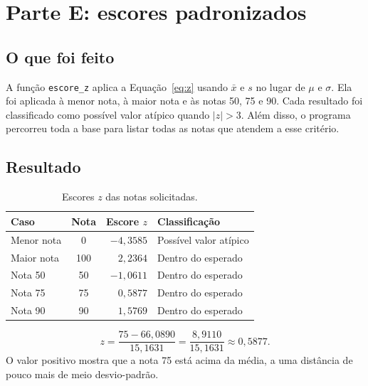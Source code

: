 \documentclass[12pt,a4paper]{article}
\begin{document}
\section{Parte E: escores padronizados}\label{sec:e}

\subsection{O que foi feito}

A função \texttt{escore\_z} aplica a Equação~\eqref{eq:z} usando $\bar{x}$ e $s$ no lugar de $\mu$ e $\sigma$. Ela foi aplicada à menor nota, à maior nota e às notas 50, 75 e 90. Cada resultado foi classificado como possível valor atípico quando $|z|>3$. Além disso, o programa percorreu toda a base para listar todas as notas que atendem a esse critério.

\subsection{Resultado}

\begin{table}[H]
  \centering
  \caption{Escores $z$ das notas solicitadas.}
  \label{tab:z}
  \begin{tabular}{l c r l}
    \toprule
    \textbf{Caso} & \textbf{Nota} & \textbf{Escore $z$} & \textbf{Classificação} \\
    \midrule
    Menor nota & 0   & $-4{,}3585$ & Possível valor atípico \\
    Maior nota & 100 & $2{,}2364$  & Dentro do esperado \\
    Nota 50    & 50  & $-1{,}0611$ & Dentro do esperado \\
    Nota 75    & 75  & $0{,}5877$  & Dentro do esperado \\
    Nota 90    & 90  & $1{,}5769$  & Dentro do esperado \\
    \bottomrule
  \end{tabular}
\end{table}

\begin{exemplo}[(nota 75)]
\[
  z = \frac{75 - 66{,}0890}{15{,}1631} = \frac{8{,}9110}{15{,}1631} \approx 0{,}5877 .
\]
O valor positivo mostra que a nota 75 está acima da média, a uma distância de pouco mais de meio desvio-padrão.
\end{exemplo}
\end{document}
